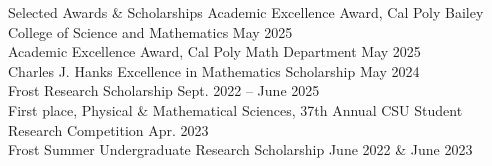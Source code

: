 \documentclass[
	11pt, %
]{cv} %
\begin{document}
\begin{rSection}{Selected Awards \& Scholarships}
	Academic Excellence Award, Cal Poly Bailey College of Science and Mathematics \dotfill May 2025 \\
	Academic Excellence Award, Cal Poly Math Department \dotfill May 2025 \\
	Charles J. Hanks Excellence in Mathematics Scholarship \dotfill May 2024 \\
	Frost Research Scholarship \dotfill Sept. 2022 -- June 2025 \\
	First place, Physical \& Mathematical Sciences, 37th Annual CSU Student Research Competition \dotfill Apr. 2023 \\
	Frost Summer Undergraduate Research Scholarship \dotfill June 2022 \& June 2023
\end{rSection}
\end{document}
